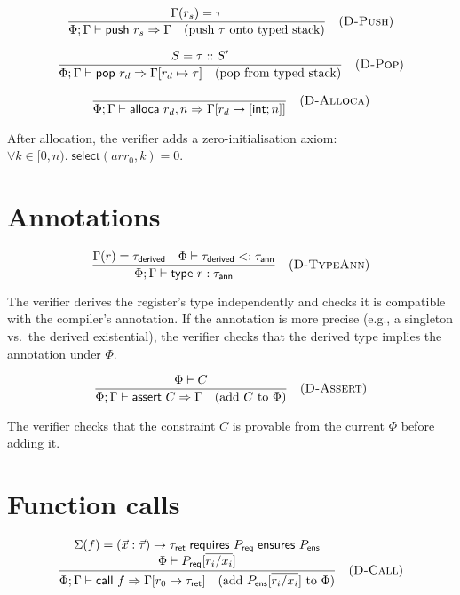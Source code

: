 $$
  \frac{\Gamma(r_s) = \tau}{\Phi; \Gamma \vdash \textsf{push } r_s \Rightarrow \Gamma \quad \text{(push } \tau \text{ onto typed stack)}} \quad (\textsc{D-Push})
$$

$$
  \frac{S = \tau :: S'}{\Phi; \Gamma \vdash \textsf{pop } r_d \Rightarrow \Gamma[r_d \mapsto \tau] \quad \text{(pop from typed stack)}} \quad (\textsc{D-Pop})
$$

$$
  \frac{}{\Phi; \Gamma \vdash \textsf{alloca } r_d, n \Rightarrow \Gamma[r_d \mapsto [\textsf{int}; n]]} \quad (\textsc{D-Alloca})
$$

\noindent After allocation, the verifier adds a zero-initialisation axiom: $\forall k \in [0, n).\; \textsf{select}(\mathit{arr}_0, k) = 0$.

\section*{Annotations}

$$
  \frac{
    \Gamma(r) = \tau_\textsf{derived} \quad \Phi \vdash \tau_\textsf{derived} <: \tau_\textsf{ann}
  }{\Phi; \Gamma \vdash \textsf{type } r: \tau_\textsf{ann}} \quad (\textsc{D-TypeAnn})
$$

\noindent The verifier derives the register's type independently and checks it is compatible with the compiler's annotation. If the annotation is more precise (e.g., a singleton vs.\ the derived existential), the verifier checks that the derived type implies the annotation under $\Phi$.

$$
  \frac{
    \Phi \vdash C
  }{\Phi; \Gamma \vdash \textsf{assert } C \Rightarrow \Gamma \quad \text{(add } C \text{ to } \Phi\text{)}} \quad (\textsc{D-Assert})
$$

\noindent The verifier checks that the constraint $C$ is provable from the current $\Phi$ before adding it.

\section*{Function calls}

$$
  \frac{
    \begin{array}{c}
      \Sigma(f) = (\vec{x}:\vec{\tau}) \rightarrow \tau_\textsf{ret} \;\textsf{requires } P_\textsf{req} \;\textsf{ensures } P_\textsf{ens} \\
      \Phi \vdash P_\textsf{req}[\overline{r_i / x_i}]
    \end{array}
  }{\Phi; \Gamma \vdash \textsf{call } f \Rightarrow \Gamma[r_0 \mapsto \tau_\textsf{ret}] \quad \text{(add } P_\textsf{ens}[\overline{r_i / x_i}] \text{ to } \Phi\text{)}} \quad (\textsc{D-Call})
$$

